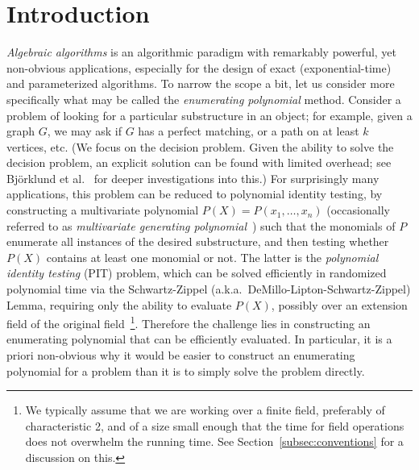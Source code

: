 \documentclass[10pt,a4paper]{article}
\begin{document}
\section{Introduction} \label{sec:intro}

\emph{Algebraic algorithms} is an algorithmic paradigm with 
remarkably powerful, yet non-obvious applications, especially for the design of  exact (exponential-time) and
parameterized algorithms. To narrow the scope a bit, let us consider
more specifically what may be called the \emph{enumerating polynomial}
method. Consider a problem of looking for a particular substructure in
an object; for example, given a graph $G$, we may ask if $G$ has a
perfect matching, or a path on at least $k$ vertices, etc. (We
  focus on the decision problem. Given the ability to solve the
  decision problem, an explicit solution can be found with limited
  overhead; see Bj\"orklund et al.~\cite{BjorklundKK14witness,BjorklundKKL15alenex} 
  for deeper investigations into this.)
For surprisingly many applications, this problem can be reduced to
polynomial identity testing, by constructing a multivariate polynomial
$P(X)=P(x_1,\ldots,x_n)$ (occasionally referred to as \emph{multivariate generating polynomial}~\cite{Brand19thesis})
such that the monomials of $P$ enumerate all
instances of the desired substructure, and then testing
whether $P(X)$ contains at least one monomial or not. The latter is
the \emph{polynomial identity testing} (PIT) problem, which can be
solved efficiently in randomized polynomial time via the Schwartz-Zippel
(a.k.a.\ DeMillo-Lipton-Schwartz-Zippel) Lemma, requiring only the ability
to evaluate $P(X)$, possibly over an extension field of the original
field~\cite{Schwartz80,Zippel79}\footnote{We typically assume that we are working over a
  finite field, preferably of characteristic 2, and of a size small enough that the time for field operations does not overwhelm the running time. 
  See Section~\ref{subsec:conventions} for a discussion on this.}.
Therefore the challenge lies in
constructing an enumerating polynomial that can be
efficiently evaluated. In particular, it is a priori non-obvious why
it would be easier to construct an enumerating polynomial for a
problem than it is to simply solve the problem directly. 
\end{document}
